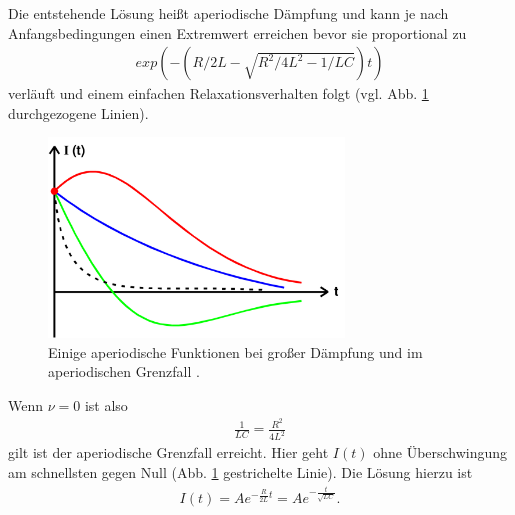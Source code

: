Die entstehende Lösung heißt aperiodische Dämpfung und kann je nach Anfangsbedingungen einen Extremwert erreichen bevor sie
proportional zu
\begin{align*}
    exp \left(-  \left( R/2L - \sqrt{R^2 / 4 L^2 - 1/LC} \right) t \right)
\end{align*}
verläuft und einem einfachen Relaxationsverhalten folgt (vgl. Abb. \ref{fig:Abfall_Funktionen} durchgezogene Linien).
\begin{figure}
    \centering
    \includegraphics[width=0.7\textwidth]{Abbildungen/Abfall_Funktionen.png}
    \caption{Einige aperiodische Funktionen bei großer Dämpfung und im aperiodischen Grenzfall \cite{man:v354}.}
    \label{fig:Abfall_Funktionen}
\end{figure}
Wenn $\stackrel{~}{\nu} = 0$ ist also
\begin{align*}
    \frac{1}{LC} = \frac{R^2}{4L^2}
\end{align*}
gilt ist der aperiodische Grenzfall erreicht.
Hier geht $I(t)$ ohne Überschwingung am schnellsten gegen Null (Abb. \ref{fig:Abfall_Funktionen} gestrichelte Linie).
Die Lösung hierzu ist
\begin{align}
    I(t) = A e^{- \frac{R}{2L} t} = A e^{- \frac{t}{\sqrt{LC}}} .
    \label{eq:Aperiodischer_Grenzfall}
\end{align}